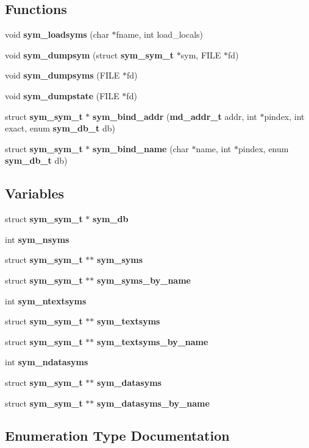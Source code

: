 \subsection*{Functions}
\begin{CompactItemize}
\item 
void {\bf sym\_\-loadsyms} (char $\ast$fname, int load\_\-locals)
\item 
void {\bf sym\_\-dumpsym} (struct {\bf sym\_\-sym\_\-t} $\ast$sym, FILE $\ast$fd)
\item 
void {\bf sym\_\-dumpsyms} (FILE $\ast$fd)
\item 
void {\bf sym\_\-dumpstate} (FILE $\ast$fd)
\item 
struct {\bf sym\_\-sym\_\-t} $\ast$ {\bf sym\_\-bind\_\-addr} ({\bf md\_\-addr\_\-t} addr, int $\ast$pindex, int exact, enum {\bf sym\_\-db\_\-t} db)
\item 
struct {\bf sym\_\-sym\_\-t} $\ast$ {\bf sym\_\-bind\_\-name} (char $\ast$name, int $\ast$pindex, enum {\bf sym\_\-db\_\-t} db)
\end{CompactItemize}
\subsection*{Variables}
\begin{CompactItemize}
\item 
struct {\bf sym\_\-sym\_\-t} $\ast$ {\bf sym\_\-db}
\item 
int {\bf sym\_\-nsyms}
\item 
struct {\bf sym\_\-sym\_\-t} $\ast$$\ast$ {\bf sym\_\-syms}
\item 
struct {\bf sym\_\-sym\_\-t} $\ast$$\ast$ {\bf sym\_\-syms\_\-by\_\-name}
\item 
int {\bf sym\_\-ntextsyms}
\item 
struct {\bf sym\_\-sym\_\-t} $\ast$$\ast$ {\bf sym\_\-textsyms}
\item 
struct {\bf sym\_\-sym\_\-t} $\ast$$\ast$ {\bf sym\_\-textsyms\_\-by\_\-name}
\item 
int {\bf sym\_\-ndatasyms}
\item 
struct {\bf sym\_\-sym\_\-t} $\ast$$\ast$ {\bf sym\_\-datasyms}
\item 
struct {\bf sym\_\-sym\_\-t} $\ast$$\ast$ {\bf sym\_\-datasyms\_\-by\_\-name}
\end{CompactItemize}


\subsection{Enumeration Type Documentation}
